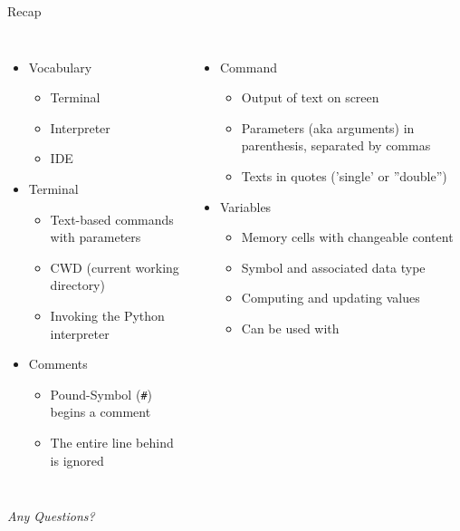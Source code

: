 
\begin{frame}[t,plain]
\titlepage
\end{frame}


\begin{frame}{Recap}
%
\begin{columns}[T]
\begin{itemize}
\item Vocabulary
	\begin{itemize}
	\item Terminal
	\item Interpreter
	\item IDE
	\end{itemize}
\item Terminal
	\begin{itemize}
	\item Text-based commands with parameters
	\item CWD (current working directory)
	\item Invoking the Python interpreter
	\end{itemize}
\item Comments
	\begin{itemize}
	\item Pound-Symbol (\texttt{\#}) begins a comment
	\item The entire line behind is ignored
	\end{itemize}
\end{itemize}
%
\begin{itemize}
\item Command 
	\begin{itemize}
	\item Output of text on screen
	\item Parameters (aka arguments) in parenthesis, separated by commas
	\item Texts in quotes ('single' or ''double'')
	\end{itemize}
\item Variables
	\begin{itemize}
	\item Memory cells with changeable content
	\item Symbol and associated data type
	\item Computing and updating values
	\item Can be used with 
	\end{itemize}
\end{itemize}
\end{columns}
%
\begin{center}
	\emph{Any Questions?}
\end{center}
%
\end{frame}


